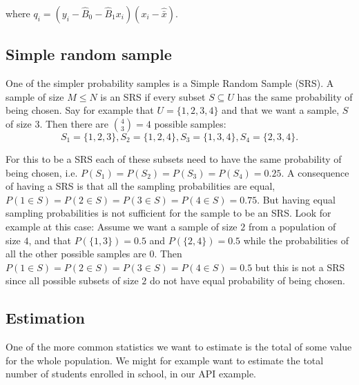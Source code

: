 \documentclass{article}
\begin{document}
where \(q_i = (y_i - \hat{B}_0 - \hat{B}_1 x_i)(x_i - \hat{\bar{x}})\).

\subsection{Simple random sample}

One of the simpler probability samples is a Simple Random Sample (SRS). A
sample of size \(M \leq N\) is an SRS if every subset \(S \subseteq U\) has the same
probability of being chosen.
Say for example that \(U = \{1, 2, 3, 4\}\) and that we want a sample, \(S\) of
size \(3\). Then there are \(\binom{4}{3} = 4\)  possible samples:
\begin{equation*}
 S_1 = \{1, 2, 3\}, 
 S_2 = \{1, 2, 4\}, 
 S_3 = \{1, 3, 4\}, 
 S_4 = \{2, 3, 4\} .
 \end{equation*}


For this to be a SRS each of these subsets need to have the same probability of
being chosen, i.e. \(P(S_1) = P(S_2) = P(S_3) = P(S_4) = 0.25\). A consequence of
having a SRS is that all the sampling probabilities are equal, \(P(1 \in S) =
P(2 \in S) = P(3 \in S) = P(4 \in S) = 0.75\). But having equal sampling
probabilities is not sufficient for the sample to be an SRS.
Look for example at this case:
Assume we want a sample of size \(2\) from a population of size \(4\), and that
\(P(\{1, 3\}) = 0.5\) and \(P(\{2, 4\}) = 0.5\) while the probabilities of all the
other possible samples are \(0\). Then \(P(1 \in S) = P(2 \in S) = P(3 \in S) = P(4 \in S) = 0.5\)
but this is not a SRS since all possible subsets of size \(2\) do not have equal
probability of being chosen.


\subsection{Estimation}

One of the more common statistics we want to estimate is the total of some value
for the whole population. We might for example want to estimate the total number
of students enrolled in school, in our API example.
\end{document}
